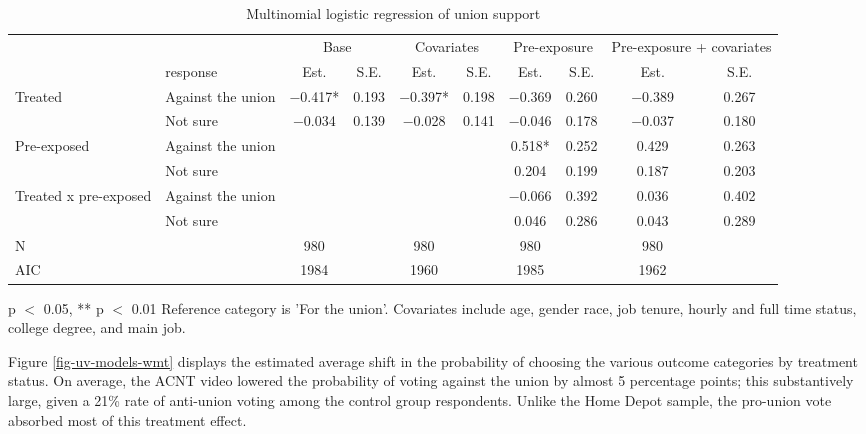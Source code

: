 \documentclass[
  11pt,
  oneside]{article}
\begin{document}
\begin{table}
\centering
\caption{\label{tab:tab-uv-models-wmt}Multinomial logistic regression of union support \label{tab:tab-uv-models-wmt}}
\centering
\begin{threeparttable}
\begin{tabular}[t]{llcccccccc}
\toprule
\multicolumn{2}{c}{ } & \multicolumn{2}{c}{Base} & \multicolumn{2}{c}{Covariates} & \multicolumn{2}{c}{Pre-exposure} & \multicolumn{2}{c}{Pre-exposure +
 covariates} \\
\cmidrule(l{3pt}r{3pt}){3-4} \cmidrule(l{3pt}r{3pt}){5-6} \cmidrule(l{3pt}r{3pt}){7-8} \cmidrule(l{3pt}r{3pt}){9-10}
  & response & Est. & S.E. & Est. & S.E. & Est. & S.E. & Est. & S.E.\\
\midrule
Treated & Against the union & \num{-0.417}* & \num{0.193} & \num{-0.397}* & \num{0.198} & \num{-0.369} & \num{0.260} & \num{-0.389} & \num{0.267}\\
 & Not sure & \num{-0.034} & \num{0.139} & \num{-0.028} & \num{0.141} & \num{-0.046} & \num{0.178} & \num{-0.037} & \num{0.180}\\
Pre-exposed & Against the union &  &  &  &  & \num{0.518}* & \num{0.252} & \num{0.429} & \num{0.263}\\
 & Not sure &  &  &  &  & \num{0.204} & \num{0.199} & \num{0.187} & \num{0.203}\\
Treated x pre-exposed & Against the union &  &  &  &  & \num{-0.066} & \num{0.392} & \num{0.036} & \num{0.402}\\
 & Not sure &  &  &  &  & \num{0.046} & \num{0.286} & \num{0.043} & \num{0.289}\\
\midrule
N &  & \num{980} &  & \num{980} &  & \num{980} &  & \num{980} & \\
AIC &  & \num{1984} &  & \num{1960} &  & \num{1985} &  & \num{1962} & \\
\bottomrule
\end{tabular}
\begin{tablenotes}
\item * p $<$ 0.05, ** p $<$ 0.01 Reference category is 'For the union'. Covariates include age, gender race, job tenure, hourly and full time status, college degree, and main job.
\end{tablenotes}
\end{threeparttable}
\end{table}

Figure \ref{fig-uv-models-wmt} displays the estimated average shift in the probability of choosing the various outcome categories by treatment status. On average, the ACNT video lowered the probability of voting against the union by almost 5 percentage points; this substantively large, given a 21\% rate of anti-union voting among the control group respondents. Unlike the Home Depot sample, the pro-union vote absorbed most of this treatment effect.
\end{document}
